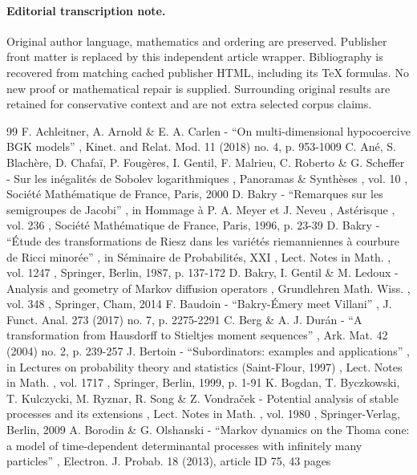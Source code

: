 \documentclass[11pt]{article}
\numberwithin{equation}{section}
\begin{document}
\paragraph{Editorial transcription note.}
Original author language, mathematics and ordering are preserved. Publisher front matter is replaced by this independent article wrapper. Bibliography is recovered from matching cached publisher HTML, including its TeX formulas. No new proof or mathematical repair is supplied. Surrounding original results are retained for conservative context and are not extra selected corpus claims.
\clearpage

\begin{thebibliography}{99}
 F. Achleitner, A. Arnold \& E. A. Carlen - “On multi-dimensional hypocoercive BGK models” , Kinet. and Relat. Mod. 11 (2018) no. 4, p. 953-1009
 C. Ané, S. Blachère, D. Chafaï, P. Fougères, I. Gentil, F. Malrieu, C. Roberto \& G. Scheffer - Sur les inégalités de Sobolev logarithmiques , Panoramas \& Synthèses , vol. 10 , Société Mathématique de France, Paris, 2000
 D. Bakry - “Remarques sur les semigroupes de Jacobi” , in Hommage à P. A. Meyer et J. Neveu , Astérisque , vol. 236 , Société Mathématique de France, Paris, 1996, p. 23-39
 D. Bakry - “Étude des transformations de Riesz dans les variétés riemanniennes à courbure de Ricci minorée” , in Séminaire de Probabilités, XXI , Lect. Notes in Math. , vol. 1247 , Springer, Berlin, 1987, p. 137-172
 D. Bakry, I. Gentil \& M. Ledoux - Analysis and geometry of Markov diffusion operators , Grundlehren Math. Wiss. , vol. 348 , Springer, Cham, 2014
 F. Baudoin - “Bakry-Émery meet Villani” , J. Funct. Anal. 273 (2017) no. 7, p. 2275-2291
 C. Berg \& A. J. Durán - “A transformation from Hausdorff to Stieltjes moment sequences” , Ark. Mat. 42 (2004) no. 2, p. 239-257
 J. Bertoin - “Subordinators: examples and applications” , in Lectures on probability theory and statistics (Saint-Flour, 1997) , Lect. Notes in Math. , vol. 1717 , Springer, Berlin, 1999, p. 1-91
 K. Bogdan, T. Byczkowski, T. Kulczycki, M. Ryznar, R. Song \& Z. Vondraček - Potential analysis of stable processes and its extensions , Lect. Notes in Math. , vol. 1980 , Springer-Verlag, Berlin, 2009
 A. Borodin \& G. Olshanski - “Markov dynamics on the Thoma cone: a model of time-dependent determinantal processes with infinitely many particles” , Electron. J. Probab. 18 (2013), article ID 75, 43 pages

\end{thebibliography}
\end{document}
